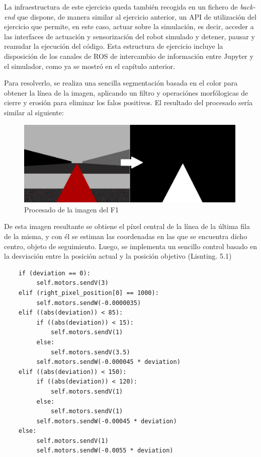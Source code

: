 La infraestructura de este ejercicio queda también recogida en un fichero de \textit{back-end} que dispone, de manera similar al ejercicio anterior, un API de utilización del ejercicio que permite, en este caso, actuar sobre la simulación, es decir, acceder a las interfaces de actuación y sensorización del robot simulado y detener, pausar y reanudar la ejecución del código. Esta estructura de ejercicio incluye la disposición de los canales de ROS de intercambio de información entre Jupyter y el simulador, como ya se mostró en el capítulo anterior.

Para resolverlo, se realiza una sencilla segmentación basada en el color para obtener la línea de la imagen, aplicando un filtro y operaciónes morfólogicas de cierre y erosión para eliminar los falos positivos. El resultado del procesado sería similar al siguiente:

\begin{figure}[!hbtp]  \centering\noindent
    \includegraphics[width=0.99\textwidth]{figures/fl_process.png}
    \caption{Procesado de la imagen del F1}
    \label{fl_process}
\end{figure}

De esta imagen resultante se obtiene el píxel central de la línea de la última fila de la misma, y con él se estiman las coordenadas en las que se encuentra dicho centro, objeto de seguimiento. Luego, se implementa un sencillo control basado en la desviación entre la posición actual y la posición objetivo (Lisnting. 5.1)

\begin{verbatim}
    if (deviation == 0):
         self.motors.sendV(3)
    elif (right_pixel_position[0] == 1000):
         self.motors.sendW(-0.0000035)
    elif ((abs(deviation)) < 85):
         if ((abs(deviation)) < 15):
             self.motors.sendV(1)
         else:
             self.motors.sendV(3.5)
         self.motors.sendW(-0.000045 * deviation)
    elif ((abs(deviation)) < 150):
         if ((abs(deviation)) < 120):
             self.motors.sendV(1)
         else:
             self.motors.sendV(1)
         self.motors.sendW(-0.00045 * deviation)
    else:
         self.motors.sendV(1)
         self.motors.sendW(-0.0055 * deviation)
\end{verbatim}
\begin{lstlisting}[caption=Control basado en desviación]
\end{lstlisting}


